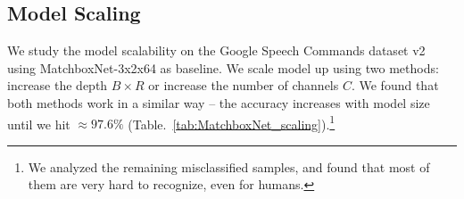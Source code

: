 \documentclass[a4paper]{article}
\begin{document}
{\renewcommand{\arraystretch}{1.1}
\begin{table}[!h]
\caption{MatchboxNet on Google Speech Commands dataset v2, the accuracy is averaged over 5 trials (95\% Confidence Interval).}
\label{tab:QuartzNet_Scores_v2}
\centering
{}
\end{table}
}

\subsection{Model Scaling}
We study the model scalability on the Google Speech Commands dataset v2 using MatchboxNet-3x2x64 as baseline. We scale model up using two methods: increase the depth $B\times R$ or increase the number of channels $C$. We found that both methods work in a similar way -- the accuracy increases with model size until we hit $\approx97.6\%$ (Table.~\ref{tab:MatchboxNet_scaling}).\footnote{We analyzed the remaining misclassified samples, and found that most of them are very hard to recognize, even for humans.}

{\renewcommand{\arraystretch}{1.1}
\begin{table}[!h]
\caption{Scaling up MatchboxNet depth and number of channels, Speech Commands Dataset v2}
\label{tab:MatchboxNet_scaling}
\centering
{}
\end{table}
}
\end{document}
